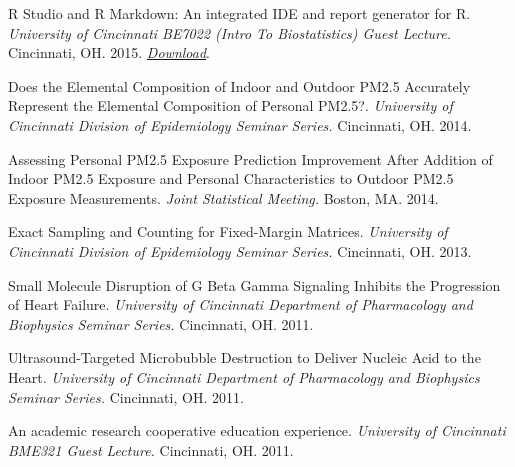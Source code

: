 R Studio and R Markdown: An integrated IDE and report generator for R.
\emph{University of Cincinnati BE7022 (Intro To Biostatistics) Guest
Lecture.} Cincinnati, OH. 2015.
\emph{\href{http://colebrokamp-website.s3.amazonaws.com/talks/RStudio_and_RMarkdown.pdf}{Download}}.

Does the Elemental Composition of Indoor and Outdoor PM2.5 Accurately
Represent the Elemental Composition of Personal PM2.5?. \emph{University
of Cincinnati Division of Epidemiology Seminar Series.} Cincinnati, OH.
2014.

Assessing Personal PM2.5 Exposure Prediction Improvement After Addition
of Indoor PM2.5 Exposure and Personal Characteristics to Outdoor PM2.5
Exposure Measurements. \emph{Joint Statistical Meeting.} Boston, MA.
2014.

Exact Sampling and Counting for Fixed-Margin Matrices. \emph{University
of Cincinnati Division of Epidemiology Seminar Series.} Cincinnati, OH.
2013.

Small Molecule Disruption of G Beta Gamma Signaling Inhibits the
Progression of Heart Failure. \emph{University of Cincinnati Department
of Pharmacology and Biophysics Seminar Series.} Cincinnati, OH. 2011.

Ultrasound-Targeted Microbubble Destruction to Deliver Nucleic Acid to
the Heart. \emph{University of Cincinnati Department of Pharmacology and
Biophysics Seminar Series.} Cincinnati, OH. 2011.

An academic research cooperative education experience. \emph{University
of Cincinnati BME321 Guest Lecture.} Cincinnati, OH. 2011.
